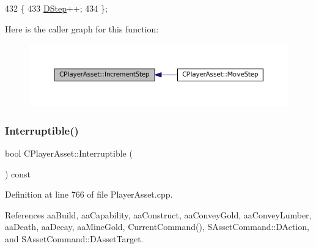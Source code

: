 \begin{DoxyCode}
432                             \{
433             \hyperlink{classCPlayerAsset_a7964d2161d51b3edd66fbc9c59eba4b0}{DStep}++;    
434         \};
\end{DoxyCode}
Here is the caller graph for this function\+:\nopagebreak
\begin{figure}[H]
\begin{center}
\leavevmode
\includegraphics[width=350pt]{classCPlayerAsset_aa1d39b408fd5aa11f2c3a19ef4d3895d_icgraph}
\end{center}
\end{figure}
\hypertarget{classCPlayerAsset_a927a79955847918fa2807d37374b4fb6}{}\label{classCPlayerAsset_a927a79955847918fa2807d37374b4fb6} 
\subsubsection{\texorpdfstring{Interruptible()}{Interruptible()}}
{\footnotesize\ttfamily bool C\+Player\+Asset\+::\+Interruptible (\begin{DoxyParamCaption}{ }\end{DoxyParamCaption}) const}



Definition at line 766 of file Player\+Asset.\+cpp.



References aa\+Build, aa\+Capability, aa\+Construct, aa\+Convey\+Gold, aa\+Convey\+Lumber, aa\+Death, aa\+Decay, aa\+Mine\+Gold, Current\+Command(), S\+Asset\+Command\+::\+D\+Action, and S\+Asset\+Command\+::\+D\+Asset\+Target.


